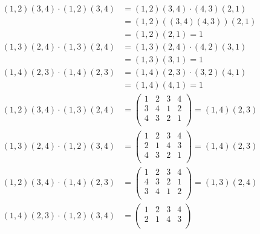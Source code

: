 \documentclass[12pt,letterpaper]{article}
\theoremstyle{definition}
\begin{document}
\begin{align*}
  (1,2)(3,4) \cdot (1,2)(3,4) &= (1,2)(3,4) \cdot (4,3)(2,1) \\
                              &= (1,2)((3,4)(4,3))(2,1) \\
                              &= (1,2)(2,1) = 1 \\
  (1,3)(2,4) \cdot (1,3)(2,4) &= (1,3)(2,4) \cdot (4,2)(3,1) \\
                              &= (1,3)(3,1) = 1 \\
  (1,4)(2,3) \cdot (1,4)(2,3) &= (1,4)(2,3) \cdot (3,2)(4,1) \\
                              &= (1,4)(4,1) = 1 \\
  (1,2)(3,4) \cdot (1,3)(2,4) &=
                                \begin{pmatrix}
                                  1 & 2 & 3 & 4 \\
                                  3 & 4 & 1 & 2 \\
                                  4 & 3 & 2 & 1 \\
                                \end{pmatrix} = (1,4)(2,3) \\
  (1,3)(2,4) \cdot (1,2)(3,4) &=
                                \begin{pmatrix}
                                  1 & 2 & 3 & 4 \\
                                  2 & 1 & 4 & 3 \\
                                  4 & 3 & 2 & 1 \\
                                \end{pmatrix} = (1,4)(2,3) \\
  (1,2)(3,4) \cdot (1,4)(2,3) &=
                                \begin{pmatrix}
                                  1 & 2 & 3 & 4 \\
                                  4 & 3 & 2 & 1 \\
                                  3 & 4 & 1 & 2 \\
                                \end{pmatrix} = (1,3)(2,4) \\
  (1,4)(2,3) \cdot (1,2)(3,4) &=
                                \begin{pmatrix}
                                  1 & 2 & 3 & 4 \\
                                  2 & 1 & 4 & 3 \\

\end{pmatrix}
\end{align*}
\end{document}
